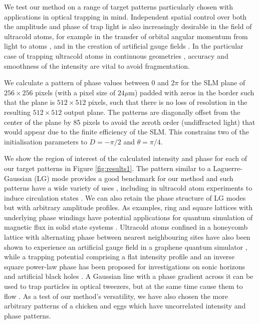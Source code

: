 \documentclass[amsmath,onecolumn,superscriptaddress,notitlepage]{revtex4-1}
\begin{document}
We test our method on a range of target patterns particularly chosen with applications in optical trapping in mind. Independent spatial control over both the amplitude and phase of trap light is also increasingly desirable in the field of ultracold atoms, for example in the transfer of orbital angular momentum from light to atoms \cite{Ramanathan+11}, and in the creation of artificial gauge fields \cite{Huo+14,Lembessis+15,Butera+16}. In the particular case of trapping ultracold atoms in continuous geometries \cite{Pasienski+08,Bruce+11,Gaunt+12,Bowman+15,Bruce+15,Buccheri+16}, accuracy and smoothness of the intensity are vital to avoid fragmentation. 

We calculate a pattern of phase values between 0 and $2\pi$ for the SLM plane of $256\times 256$ pixels (with a pixel size of $24\mu\text{m}$) padded with zeros in the border such that the plane is $512\times 512$ pixels, such that there is no loss of resolution in the resulting $512\times 512$ output plane. The patterns are diagonally offset from the center of the plane by 85 pixels to avoid the zeroth order (undiffracted light) that would appear due to the finite efficiency of the SLM. This constrains two of the initialisation parameters to $D = -\pi/2$ and $\theta=\pi/4$. 

We show the region of interest of the calculated intensity and phase for each of our target patterns in Figure \ref{fig:results1}. The pattern similar to a Laguerre-Gaussian (LG) mode provides a good benchmark for our method and such patterns have a wide variety of uses \cite{Yao+11}, including in ultracold atom experiments to induce circulation states \cite{Ramanathan+11}. We can also retain the phase structure of LG modes but with arbitrary amplitude profiles. As examples, ring and square lattices with underlying phase windings have potential applications for quantum simulation of magnetic flux in solid state systems \cite{Huo+14}.  Ultracold atoms confined in a honeycomb lattice with alternating phase between nearest neighbouring sites have also been shown to experience an artificial gauge field in a graphene quantum simulator \cite{Lembessis+15}, while a trapping potential comprising a flat intensity profile and an inverse square power-law phase has been proposed for investigations on sonic horizons and artificial black holes \cite{Butera+16}. A Gaussian line with a phase gradient across it can be used to trap particles in optical tweezers, but at the same time cause them to flow \cite{Roichman+08}. As a test of our method's versatility, we have also chosen the more arbitrary patterns of a chicken and eggs \cite{Chicken} which have uncorrelated intensity and phase patterns.
\end{document}
